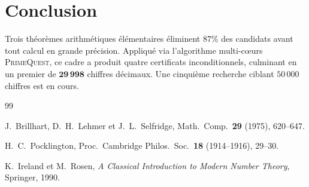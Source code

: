 \documentclass[11pt,a4paper]{article}
\theoremstyle{definition}
\theoremstyle{remark}
\begin{document}
\section{Conclusion}\label{sec:conclusion}

Trois théorèmes arithmétiques élémentaires éliminent $87\%$ des candidats
avant tout calcul en grande précision. Appliqué via l'algorithme
multi-c\oe{}urs \textsc{PrimeQuest}, ce cadre a produit quatre certificats
inconditionnels, culminant en un premier de $\mathbf{29\,998}$ chiffres
décimaux. Une cinquième recherche ciblant $50\,000$ chiffres est en cours.

\begin{thebibliography}{99}

J.~Brillhart, D.~H.~Lehmer et J.~L.~Selfridge,
Math.\ Comp.\ \textbf{29} (1975), 620--647.

H.~C.~Pocklington,
Proc.\ Cambridge Philos.\ Soc.\ \textbf{18} (1914--1916), 29--30.

K.~Ireland et M.~Rosen, \emph{A Classical Introduction to Modern
Number Theory}, Springer, 1990.

\end{thebibliography}
\end{document}
